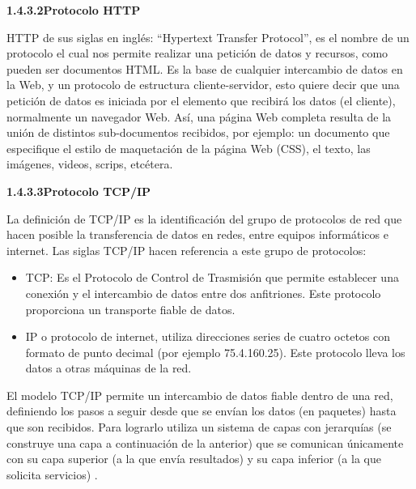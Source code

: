         \textbf{1.4.3.2\hspace{5mm}Protocolo HTTP}

    HTTP de sus siglas en inglés: “Hypertext Transfer Protocol”, es el nombre de un protocolo el cual nos permite realizar una petición de datos y recursos, como pueden ser documentos HTML. Es la base de cualquier intercambio de datos en la Web, y un protocolo de estructura cliente-servidor, esto quiere decir que una petición de datos es iniciada por el elemento que recibirá los datos (el cliente), normalmente un navegador Web. Así, una página Web completa resulta de la unión de distintos sub-documentos recibidos, por ejemplo: un documento que especifique el estilo de maquetación de la página Web (CSS), el texto, las imágenes, videos, scrips, etcétera.\\


        \textbf{1.4.3.3\hspace{5mm}Protocolo TCP/IP}

    La definición de TCP/IP es la identificación del grupo de protocolos de red que hacen posible la transferencia de datos en redes, entre equipos informáticos e internet. Las siglas TCP/IP hacen referencia a este grupo de protocolos:

    \begin{itemize}
        \item TCP: Es el Protocolo de Control de Trasmisión que permite establecer una conexión y el intercambio de datos entre dos anfitriones. Este protocolo proporciona un transporte fiable de datos.
        \item IP o protocolo de internet, utiliza direcciones series de cuatro octetos con formato de punto decimal (por ejemplo 75.4.160.25). Este protocolo lleva los datos a otras máquinas de la red.
    \end{itemize}

    El modelo TCP/IP permite un intercambio de datos fiable dentro de una red, definiendo los pasos a seguir desde que se envían los datos (en paquetes) hasta que son recibidos. Para lograrlo utiliza un sistema de capas con jerarquías (se construye una capa a continuación de la anterior) que se comunican únicamente con su capa superior (a la que envía resultados) y su capa inferior (a la que solicita servicios) \cite{tcp/ip}.

